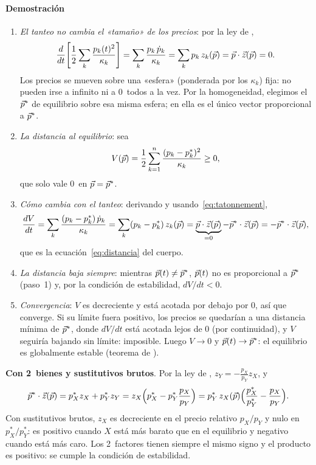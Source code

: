 \documentclass[11pt]{article}
\begin{document}
\paragraph{Demostración}

\begin{enumerate}
\item \emph{El tanteo no cambia el «tamaño» de los precios}: por la ley de ,
  \[
  \frac{d}{dt}\Bigg[\frac12\sum_{k}\frac{p_k(t)^2}{\kappa_k}\Bigg]=\sum_k\frac{p_k\,\dot p_k}{\kappa_k}=\sum_kp_k\,z_k(\vec{p})=\vec{p}\cdot\vec{z}(\vec{p})=0 .
  \]
  Los precios se mueven sobre una «esfera» (ponderada por los $\kappa_k$) fija: no pueden irse a infinito ni a 0~todos a la vez. Por la homogeneidad, elegimos el $\vec{p}^*$ de equilibrio sobre esa misma esfera; en ella es el único vector proporcional a $\vec{p}^*$.
\item \emph{La distancia al equilibrio}: sea
  \[
  V(\vec{p})=\frac12\sum_{k=1}^{n}\frac{(p_k-p^*_k)^2}{\kappa_k}\geq 0,
  \]
  que solo vale 0~en $\vec{p}=\vec{p}^*$.
\item \emph{Cómo cambia con el tanteo}: derivando y usando~\eqref{eq:tatonnement},
  \[
  \frac{dV}{dt}=\sum_k\frac{(p_k-p^*_k)\,\dot p_k}{\kappa_k}=\sum_k(p_k-p^*_k)\,z_k(\vec{p})=\underbrace{\vec{p}\cdot\vec{z}(\vec{p})}_{=0}-\vec{p}^*\cdot\vec{z}(\vec{p})=-\vec{p}^*\cdot\vec{z}(\vec{p}),
  \]
  que es la ecuación~\eqref{eq:distancia} del cuerpo.
\item \emph{La distancia baja siempre}: mientras $\vec{p}(t)\neq\vec{p}^*$, $\vec{p}(t)$ no es proporcional a $\vec{p}^*$ (paso~1) y, por la condición de estabilidad, $dV/dt<0$.
\item \emph{Convergencia}: $V$ es decreciente y está acotada por debajo por 0, así que converge. Si su límite fuera positivo, los precios se quedarían a una distancia mínima de $\vec{p}^*$, donde $dV/dt$ está acotada lejos de 0 (por continuidad), y $V$ seguiría bajando sin límite: imposible. Luego $V\to 0$ y $\vec{p}(t)\to\vec{p}^*$: el equilibrio es globalmente estable (teorema de ).\findemo
\end{enumerate}

\begin{anotaciones}
\textbf{Con 2~bienes y sustitutivos brutos}. Por la ley de , $z_Y=-\frac{p_X}{p_Y}z_X$, y
\[
\vec{p}^*\cdot\vec{z}(\vec{p})=p^*_Xz_X+p^*_Yz_Y=z_X\Big(p^*_X-p^*_Y\frac{p_X}{p_Y}\Big)=p^*_Y\,z_X(\vec{p})\Big(\frac{p^*_X}{p^*_Y}-\frac{p_X}{p_Y}\Big).
\]
Con sustitutivos brutos, $z_X$ es decreciente en el precio relativo $p_X/p_Y$ y nulo en $p^*_X/p^*_Y$: es positivo cuando $X$ está más barato que en el equilibrio y negativo cuando está más caro. Los 2~factores tienen siempre el mismo signo y el producto es positivo: se cumple la condición de estabilidad.
\end{anotaciones}
\end{document}
